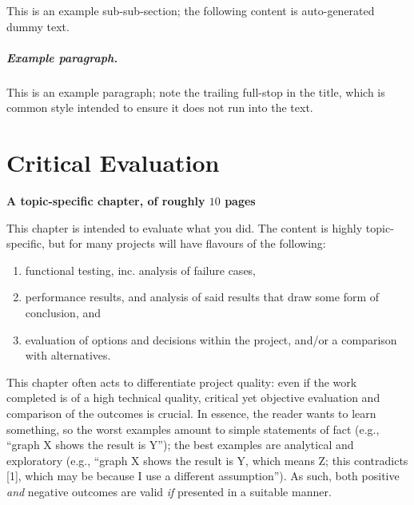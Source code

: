 \documentclass[ %
                    author={Luke Murray},
                supervisor={Dr. Simon Hollis},
                     title={Shadow Peer-to-Peer Networks},
                  subtitle={},
                    degree={MEng},
                      year={2013} ]{thesis}
\begin{document}
This is an example sub-sub-section;
the following content is auto-generated dummy text.
\lipsum

\paragraph{Example paragraph.}

This is an example paragraph; note the trailing full-stop in the title,
which is common style intended to ensure it does not run into the text.


\chapter{Critical Evaluation}
\label{chap:evaluation}

{\bf A topic-specific chapter, of roughly $10$ pages} 
\vspace{1cm} 

\noindent
This chapter is intended to evaluate what you did.  The content is highly 
topic-specific, but for many projects will have flavours of the following:

\begin{enumerate}
\item functional testing, inc. analysis of failure cases,
\item performance results, and analysis of said results that draw some 
      form of conclusion,
      and
\item evaluation of options and decisions within the project, and/or a
      comparison with alternatives.
\end{enumerate}

\noindent
This chapter often acts to differentiate project quality: even if the work
completed is of a high technical quality, critical yet objective evaluation 
and comparison of the outcomes is crucial.  In essence, the reader wants to
learn something, so the worst examples amount to simple statements of fact 
(e.g., ``graph X shows the result is Y''); the best examples are analytical 
and exploratory (e.g., ``graph X shows the result is Y, which means Z; this 
contradicts [1], which may be because I use a different assumption'').  As 
such, both positive {\em and} negative outcomes are valid {\em if} presented 
in a suitable manner.

\end{document}
